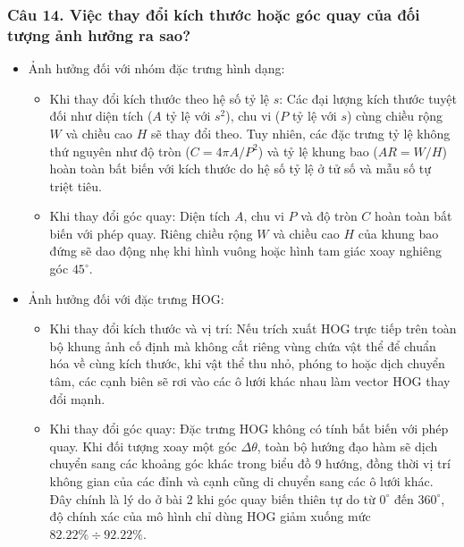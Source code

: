 \documentclass[12pt,a4paper]{article}
\begin{document}
\subsubsection*{Câu 14. Việc thay đổi kích thước hoặc góc quay của đối tượng ảnh hưởng ra sao?}
\begin{itemize}
    \item Ảnh hưởng đối với nhóm đặc trưng hình dạng:
    \begin{itemize}
        \item Khi thay đổi kích thước theo hệ số tỷ lệ $s$: Các đại lượng kích thước tuyệt đối như diện tích ($A$ tỷ lệ với $s^2$), chu vi ($P$ tỷ lệ với $s$) cùng chiều rộng $W$ và chiều cao $H$ sẽ thay đổi theo. Tuy nhiên, các đặc trưng tỷ lệ không thứ nguyên như độ tròn ($C = 4\pi A/P^2$) và tỷ lệ khung bao ($AR = W/H$) hoàn toàn bất biến với kích thước do hệ số tỷ lệ ở tử số và mẫu số tự triệt tiêu.
        \item Khi thay đổi góc quay: Diện tích $A$, chu vi $P$ và độ tròn $C$ hoàn toàn bất biến với phép quay. Riêng chiều rộng $W$ và chiều cao $H$ của khung bao đứng sẽ dao động nhẹ khi hình vuông hoặc hình tam giác xoay nghiêng góc $45^\circ$.
    \end{itemize}
    \item Ảnh hưởng đối với đặc trưng HOG:
    \begin{itemize}
        \item Khi thay đổi kích thước và vị trí: Nếu trích xuất HOG trực tiếp trên toàn bộ khung ảnh cố định mà không cắt riêng vùng chứa vật thể để chuẩn hóa về cùng kích thước, khi vật thể thu nhỏ, phóng to hoặc dịch chuyển tâm, các cạnh biên sẽ rơi vào các ô lưới khác nhau làm vector HOG thay đổi mạnh.
        \item Khi thay đổi góc quay: Đặc trưng HOG không có tính bất biến với phép quay. Khi đối tượng xoay một góc $\Delta\theta$, toàn bộ hướng đạo hàm sẽ dịch chuyển sang các khoảng góc khác trong biểu đồ 9 hướng, đồng thời vị trí không gian của các đỉnh và cạnh cũng di chuyển sang các ô lưới khác. Đây chính là lý do ở bài 2 khi góc quay biến thiên tự do từ $0^\circ$ đến $360^\circ$, độ chính xác của mô hình chỉ dùng HOG giảm xuống mức $82.22\% \div 92.22\%$.
    \end{itemize}
\end{itemize}
\end{document}
